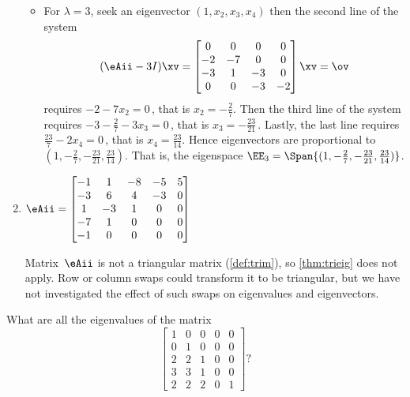 \begin{example}
\begin{enumerate}
\begin{reduce}
\begin{solution}
\begin{itemize}
\item For \(\lambda=3\), seek an eigenvector \((1,x_2,x_3,x_4)\) then the second line of the system
\begin{equation*}
(\eAii-3I)\xv=
\begin{bmatrix}0&0&0&0
\\-2&-7&0&0
\\-3&1&-3&0
\\0&0&-3&-2 \end{bmatrix}\xv=\ov
\end{equation*}
requires \(-2-7x_2=0\)\,, that is \(x_2=-\frac27\).
Then the third line of the system requires \(-3-\frac27-3x_3=0\)\,, that is \(x_3=-\frac{23}{21}\)\,. 
Lastly, the last line requires \(\frac{23}7-2x_4=0\)\,, that is \(x_4=\frac{23}{14}\).
Hence eigenvectors are proportional to \((1,-\frac27,-\frac{23}{21},\frac{23}{14})\).
That is, the eigenspace \(\EE_{3}=\Span\{(1,-\frac27,-\frac{23}{21},\frac{23}{14})\}\).

\end{itemize}
\end{solution}
\end{reduce}

\item \(\eAii=\begin{bmatrix} -1&1&-8&-5&5
\\-3&6&4&-3&0
\\1&-3&1&0&0
\\-7&1&0&0&0
\\-1&0&0&0&0 \end{bmatrix}\)
\begin{solution} 
Matrix~\(\eAii\) is not a triangular matrix (\cref{def:trim}), so \cref{thm:trieig} does not apply.
Row or column swaps could transform it to be triangular, but we have not investigated the effect of such swaps on eigenvalues and eigenvectors.
\end{solution}
\end{enumerate}
\end{example}




\begin{activity}
What are all the eigenvalues of the matrix
\begin{equation*}
\begin{bmatrix} 1&0&0&0&0
\\0&1&0&0&0
\\2&2&1&0&0
\\3&3&1&0&0
\\2&2&2&0&1
 \end{bmatrix}?
\end{equation*}
\end{activity}






